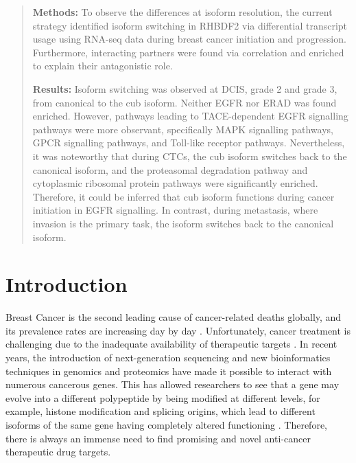 \documentclass[fleqn,10pt,lineno]{wlpeerj}
\begin{document}
\begin{abstract}
\textbf{Methods:} To observe the differences at isoform resolution, the current strategy identified isoform switching in RHBDF2 via differential transcript usage using RNA-seq data during breast cancer initiation and progression. Furthermore, interacting partners were found via correlation and enriched to explain their antagonistic role.\par
\textbf{Results:} Isoform switching was observed at DCIS, grade 2 and grade 3, from canonical to the cub isoform. Neither EGFR nor ERAD was found enriched. However, pathways leading to TACE-dependent EGFR signalling pathways were more observant, specifically MAPK signalling pathways, GPCR signalling pathways, and Toll-like receptor pathways. Nevertheless, it was noteworthy that during CTCs, the cub isoform switches back to the canonical isoform, and the proteasomal degradation pathway and cytoplasmic ribosomal protein pathways were significantly enriched. Therefore, it could be inferred that cub isoform functions during cancer initiation in EGFR signalling. In contrast, during metastasis, where invasion is the primary task, the isoform switches back to the canonical isoform.

\end{abstract}


\flushbottom
\maketitle
\thispagestyle{empty}

\section*{Introduction}

Breast Cancer is the second leading cause of cancer-related deaths globally, and its prevalence rates are increasing day by day \cite{Azamjah2019}. Unfortunately, cancer treatment is challenging due to the inadequate availability of therapeutic targets \citep{Mansoori2017}. In recent years, the introduction of next-generation sequencing and new bioinformatics techniques in genomics and proteomics have made it possible to interact with numerous cancerous genes. This has allowed researchers to see that a gene may evolve into a different polypeptide by being modified at different levels, for example, histone modification and splicing origins, which lead to different isoforms of the same gene having completely altered functioning \citep{Vitting-Seerup2017}.  Therefore, there is always an immense need to find promising and novel anti-cancer therapeutic drug targets. 
\end{document}
